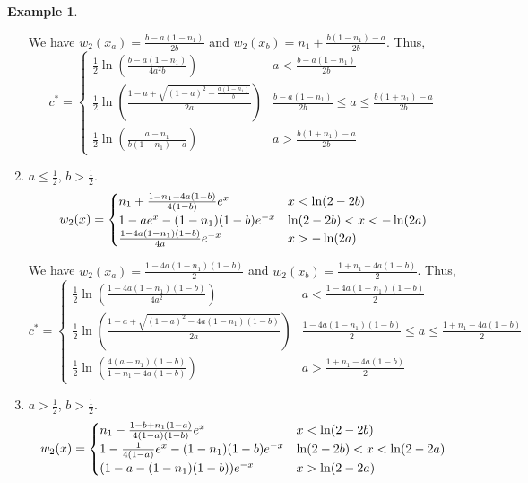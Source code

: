 \documentclass[11pt]{article}
\theoremstyle{definition}
\newtheorem{ex}[thm]{Example}
\numberwithin{equation}{section}
\numberwithin{thm}{section}
\renewcommand{\a}{a}
\renewcommand{\b}{b}
\newcommand{\m}{n_1}
\begin{document}
\begin{ex}
\begin{enumerate}[{Case} 1.]
We have $w_2(x_\a)=\frac{\b-\a(1-\m)}{2\b}$ and $w_2(x_\b)=\m + \frac{\b(1-\m)-\a}{2\b}$. Thus,
\begin{equation}
c^* = \begin{cases}
\frac{1}{2} \ln \left( \frac{\b-\a(1-\m)}{4\a^2\b} \right) & \a < \frac{\b-\a(1-\m)}{2\b} \\
\frac{1}{2} \ln \left( \frac{1-\a + \sqrt{(1-\a)^2 - \frac{\a(1-\m)}{\b}}}{2\a} \right) & \frac{\b-\a(1-\m)}{2\b} \leq \a \leq \frac{\b(1+\m)-\a}{2\b} \\
\frac{1}{2} \ln \left( \frac{\a-\m}{\b(1-\m)-\a}\right) & \a > \frac{\b(1+\m)-\a}{2\b}
\end{cases}
\end{equation}


\item $\a\leq\frac{1}{2}$, $\b>\frac{1}{2}$.
\begin{equation}
w_2(x) = \begin{cases}
\m + \Conecasetwo e^x  & x < \ln(2-2\b) \\
1 - \Ctwocaseone e^x - \Cthreecasetwo e^{-x} & \ln(2-2\b) < x < -\ln(2\a) \\
\Cfourcasetwo e^{-x} & x > -\ln(2\a)
\end{cases}
\end{equation}

We have $w_2(x_\a)=\frac{1-4\a(1-\m)(1-\b)}{2}$ and $w_2(x_\b)=\frac{1+\m-4\a(1-\b)}{2}$. Thus,
\begin{equation}
c^* = \begin{cases}
\frac{1}{2} \ln \left( \frac{1-4\a(1-\m)(1-\b)}{4\a^2} \right) & a<\frac{1-4\a(1-\m)(1-\b)}{2} \\
\frac{1}{2} \ln \left( \frac{1-\a + \sqrt{(1-\a)^2 - 4\a(1-\m)(1-\b)}}{2\a} \right) & \frac{1-4\a(1-\m)(1-\b)}{2}\leq\a\leq\frac{1+\m-4\a(1-\b)}{2} \\
\frac{1}{2} \ln \left( \frac{4(\a-\m)(1-\b)}{1-\m-4\a(1-\b)}\right) & \a>\frac{1+\m-4\a(1-\b)}{2}
\end{cases}
\end{equation}


\item $\a>\frac{1}{2}$, $\b>\frac{1}{2}$.
\begin{equation}
w_2(x) = \begin{cases}
\m \Conecasethree e^x  & x < \ln(2-2\b) \\
1 - \Ctwocasetwo e^x - \Cthreecasetwo e^{-x} & \ln(2-2\b) < x < \ln(2-2\a) \\
(\Cfourcasethree) e^{-x} & x > \ln(2-2\a)
\end{cases}
\end{equation}


\end{enumerate}
\end{ex}
\end{document}
